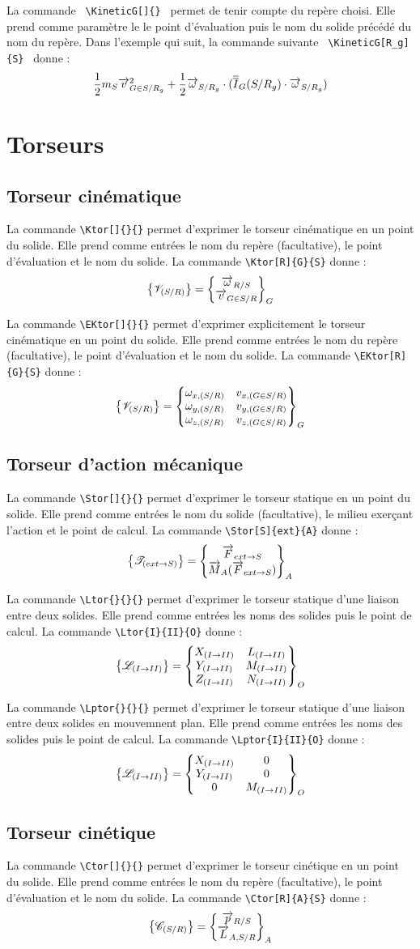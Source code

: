 \documentclass[12pt]{article}
\begin{document}
La commande \verb| \KineticG[]{} | permet de tenir compte du repère choisi. Elle prend comme paramètre le le point d'évaluation puis le nom du solide précédé du nom du repère. Dans l'exemple qui suit, la commande suivante \verb| \KineticG[R_g]{S} | donne : $$\KineticG[R_g]{S}$$

\newpage

\section{Torseurs}

\subsection{Torseur cinématique}
La commande \verb|\Ktor[]{}{}| permet d'exprimer le torseur cinématique en un point du solide. Elle prend comme entrées le nom du repère (facultative), le point d'évaluation et le nom du solide. La commande \verb|\Ktor[R]{G}{S}| donne : $$\Ktor[R]{G}{S}$$

La commande \verb|\EKtor[]{}{}| permet d'exprimer explicitement le torseur cinématique en un point du solide. Elle prend comme entrées le nom du repère (facultative), le point d'évaluation et le nom du solide. La commande \verb|\EKtor[R]{G}{S}| donne : $$\EKtor[R]{G}{S}$$

\subsection{Torseur d'action mécanique}
La commande \verb|\Stor[]{}{}| permet d'exprimer le torseur statique en un point du solide. Elle prend comme entrées le nom du solide (facultative), le milieu exerçant l'action et le point de calcul. La commande \verb|\Stor[S]{ext}{A}| donne : $$\Stor[S]{ext}{A}$$

La commande \verb|\Ltor{}{}{}| permet d'exprimer le torseur statique d'une liaison entre deux solides. Elle prend comme entrées les noms des solides puis le point de calcul. La commande \verb|\Ltor{I}{II}{O}| donne : $$\Ltor{I}{II}{O}$$

La commande \verb|\Lptor{}{}{}| permet d'exprimer le torseur statique d'une liaison entre deux solides en mouvemnent plan. Elle prend comme entrées les noms des solides puis le point de calcul. La commande \verb|\Lptor{I}{II}{O}| donne : $$\Lptor{I}{II}{O}$$

\subsection{Torseur cinétique}
La commande \verb|\Ctor[]{}{}| permet d'exprimer le torseur cinétique en un point du solide. Elle prend comme entrées le nom du repère (facultative), le point d'évaluation et le nom du solide. La commande \verb|\Ctor[R]{A}{S}| donne : $$\Ctor[R]{A}{S}$$
\end{document}
